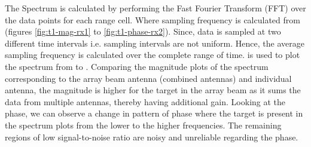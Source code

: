 The Spectrum is calculated by performing the Fast Fourier Transform (FFT) over the data points for each range cell. Where sampling frequency is calculated from  (figures \ref{fig:t1-mag-rx1} to \ref{fig:t1-phase-rx2}). Since, data is sampled at two different time intervals i.e. sampling intervals are not uniform. Hence, the average sampling frequency is calculated over the complete range of time.  is used to plot the spectrum from  to . Comparing the magnitude plots of the spectrum corresponding to the array beam antenna (combined antennas) and individual antenna, the magnitude is higher for the target in the array beam as it sums the data from multiple antennas, thereby having additional gain.
Looking at the phase, we can observe a change in pattern of phase where the target is present in the spectrum plots from the lower to the higher frequencies. The remaining regions of low signal-to-noise ratio are noisy and unreliable regarding the phase.

